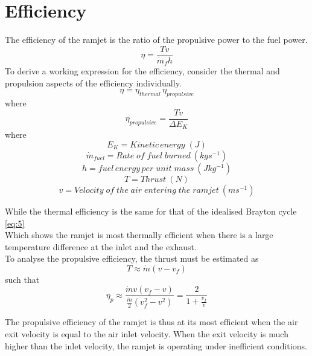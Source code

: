 \documentclass[12pt,onecolumn]{IEEEtran}
\begin{document}
\section{Efficiency}
\begin{flushleft}
The efficiency of the ramjet is the ratio of the propulsive power to the fuel power.\cite{greitzer_spakovsky_waitz}\\
\begin{equation}
 \eta = \frac{Tv}{\dot{m}_f h}
\end{equation}
To derive a working expression for the efficiency, consider the thermal and propulsion aspects of the efficiency individually.\\
\begin{equation}
\eta = \eta_{thermal}\,\eta_{propulsive}
\end{equation}
where\\
\begin{equation}
\eta_{propulsive}=\frac{Tv}{\Delta E_K}
\end{equation}
where
\[E_K =  Kinetic\,energy\;(J)\]
\[\dot{m}_{fuel} =  Rate\;of\;fuel\;burned\:(kgs^{-1})\]
\[h = fuel\,energy\,per\;unit\;mass\:(Jkg^{-1})\]
\[T =  Thrust\:(N)\]
\[v =  Velocity\;of\;the\;air\;entering\;the\;ramjet\:(ms^{-1})\]


While the thermal efficiency is the same for that of the idealised Brayton cycle \eqref{eq:5}\\
Which shows the ramjet is most thermally efficient when there is a large temperature difference at the inlet and the exhaust.\\
To analyse the propulsive efficiency, the thrust must be estimated as\\
\begin{equation}
T\approx\dot{m}(v-v_f)
\end{equation}
\vspace{1mm}
such that\\
\begin{equation}
\eta_p\approx\frac{\dot{m}v(v_f-v)}{\frac{\dot{m}}{2}(v_f^2-v^2)}=\frac{2}{1+\frac{v_f}{v}}
\end{equation}

The propulsive efficiency of the ramjet is thus at its most efficient when the air exit velocity is equal to the air inlet velocity. When the exit velocity is much higher than the inlet velocity, the ramjet is operating under inefficient conditions.
\end{flushleft}


\end{document}
